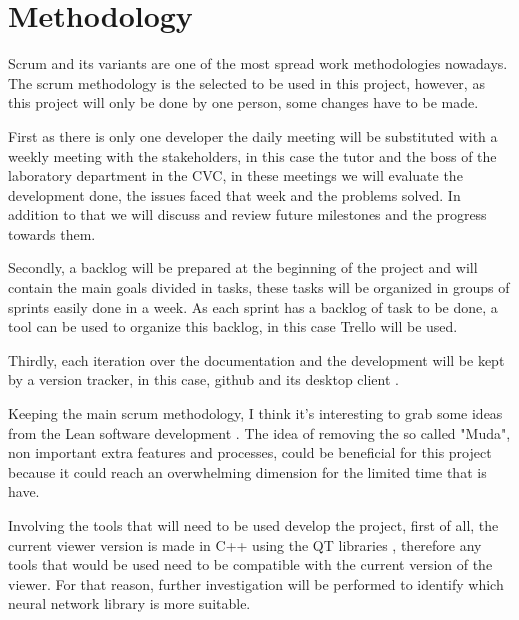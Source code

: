 \documentclass[10pt,a4paper,twocolumn,twoside]{article}
\begin{document}
	\section{Methodology}
	Scrum and its variants are one of the most spread work methodologies nowadays.
	The scrum methodology is the selected to be used in this project, however, as this project will only be done by one person, some changes have to be made. 
	
	First as there is only one developer the daily meeting will be substituted with a weekly meeting with the stakeholders, in this case the tutor and the boss of the laboratory department in the CVC, in these meetings we will evaluate the development done, the issues faced that week and the problems solved. In addition to that we will discuss and review future milestones and the progress towards them.
	
	Secondly, a backlog will be prepared at the beginning of the project and will contain the main goals divided in tasks, these tasks will be organized in groups of sprints easily done in a week. As each sprint has a backlog of task to be done, a tool can be used to organize this backlog, in this case Trello\cite{web:trello} will be used.
	
	Thirdly, each iteration over the documentation and the development will be kept by a version tracker, in this case, github \cite{web:github} and its desktop client \cite{web:githubDesktop}. 
	
	Keeping the main scrum methodology, I think it's interesting to grab some ideas from the Lean software development \cite{web:leanMethod}. The idea of removing the so called "Muda", non important extra features and processes, could be beneficial for this project because it could reach an overwhelming dimension for the limited time that is have.
	
	Involving the tools that will need to be used develop the project, first of all, the current viewer version is made in C++ using the QT libraries \cite{web:qt}, therefore any tools that would be used need to be compatible with the current version of the viewer. For that reason, further investigation will be performed to identify which neural network library is more suitable.
	
\end{document}
